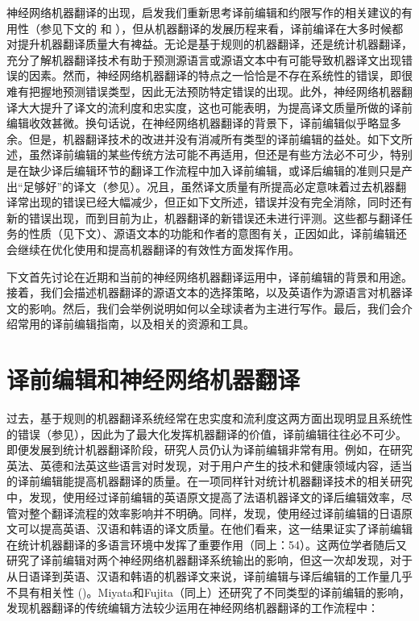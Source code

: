 \documentclass[output=paper,colorlinks,citecolor=brown]{langscibook}
\begin{document}
神经网络机器翻译的出现，启发我们重新思考译前编辑和约限写作的相关建议的有用性（参见下文的\citealt{MarzoukHansen-Schirra2019} 和 ），但从机器翻译的发展历程来看，译前编译在大多时候都对提升机器翻译质量大有裨益。无论是基于规则的机器翻译，还是统计机器翻译，充分了解机器翻译技术有助于预测源语言或源语文本中有可能导致机器译文出现错误的因素。然而，神经网络机器翻译的特点之一恰恰是不存在系统性的错误，即很难有把握地预测错误类型，因此无法预防特定错误的出现。此外，神经网络机器翻译大大提升了译文的流利度和忠实度，这也可能表明，为提高译文质量所做的译前编辑收效甚微。换句话说，在神经网络机器翻译的背景下，译前编辑似乎略显多余。但是，机器翻译技术的改进并没有消减所有类型的译前编辑的益处。如下文所述，虽然译前编辑的某些传统方法可能不再适用，但还是有些方法必不可少，特别是在缺少译后编辑环节的翻译工作流程中加入译前编辑，或译后编辑的准则只是产出“足够好”的译文（参见）。况且，虽然译文质量有所提高必定意味着过去机器翻译常出现的错误已经大幅减少，但正如下文所述，错误并没有完全消除，同时还有新的错误出现，而到目前为止，机器翻译的新错误还未进行评测。这些都与翻译任务的性质（见下文）、源语文本的功能和作者的意图有关，正因如此，译前编辑还会继续在优化使用和提高机器翻译的有效性方面发挥作用。

下文首先讨论在近期和当前的神经网络机器翻译运用中，译前编辑的背景和用途。接着，我们会描述机器翻译的源语文本的选择策略，以及英语作为源语言对机器译文的影响。然后，我们会举例说明如何以全球读者为主进行写作。最后，我们会介绍常用的译前编辑指南，以及相关的资源和工具。


\section{译前编辑和神经网络机器翻译}\label{sec:sanchez:2}
过去，基于规则的机器翻译系统经常在忠实度和流利度这两方面出现明显且系统性的错误（参见），因此为了最大化发挥机器翻译的价值，译前编辑往往必不可少。即便发展到统计机器翻译阶段，研究人员仍认为译前编辑非常有用。例如，\citet{SeretanGerlach2014}在研究英法、英德和法英这些语言对时发现，对于用户产生的技术和健康领域内容，适当的译前编辑能提高机器翻译的质量。在一项同样针对统计机器翻译技术的相关研究中，\citet{Gerlach2015}发现，使用经过译前编辑的英语原文提高了法语机器译文的译后编辑效率，尽管对整个翻译流程的效率影响并不明确。同样，\citet{MiyataFujita2017}发现，使用经过译前编辑的日语原文可以提高英语、汉语和韩语的译文质量。在他们看来，这一结果证实了译前编辑在统计机器翻译的多语言环境中发挥了重要作用（同上：54）。这两位学者随后又研究了译前编辑对两个神经网络机器翻译系统输出的影响，但这一次却发现，对于从日语译到英语、汉语和韩语的机器译文来说，译前编辑与译后编辑的工作量几乎不具有相关性 (\citealt{MiyataFujita2021})。Miyata和Fujita（同上）还研究了不同类型的译前编辑的影响，发现机器翻译的传统编辑方法较少运用在神经网络机器翻译的工作流程中：
\end{document}
